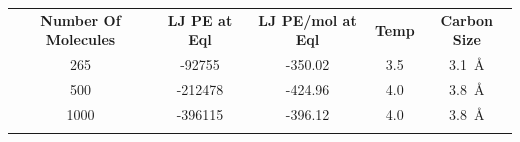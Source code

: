 \documentclass[12pt]{article}
\def\ccg{\cellcolor{gray}}
\begin{document}
\begin{center}
\begin{tabular}{| c | c | c | c | c |}
\hline
\rule{0pt}{2.5ex} 
\textbf{Number Of Molecules}&\textbf{LJ PE at Eql}&\textbf{LJ PE/mol at Eql}&\textbf{Temp}&\textbf{Carbon Size}\\
\hhline{|=====|}
\ccg 265&\ccg \rule{0pt}{2.5ex}-92755&\ccg -350.02&\ccg 3.5&\ccg 3.1~\AA\\
500&\rule{0pt}{2.5ex}-212478&-424.96&4.0&3.8~\AA\\
\ccg 1000&\ccg \rule{0pt}{2.5ex}-396115&\ccg -396.12&\ccg4.0&\ccg3.8~\AA\\
\hhline{-----}
\end{tabular}\label{table:PE}
\end{center}



\end{document}
